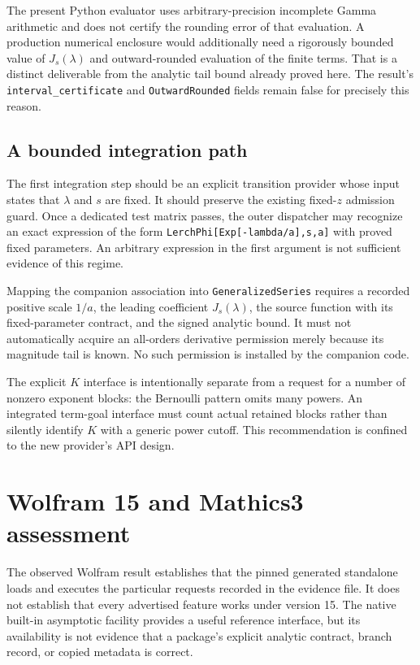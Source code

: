 \documentclass[11pt,a4paper]{article}
\newcommand{\code}[1]{\nolinkurl{#1}}
\begin{document}
The present Python evaluator uses arbitrary-precision incomplete Gamma
arithmetic and does not certify the rounding error of that evaluation.
A production numerical enclosure would additionally need a rigorously bounded
value of $J_s(\lambda)$ and outward-rounded evaluation of the finite terms.
That is a distinct deliverable from the analytic tail bound already proved
here. The result's \code{interval_certificate} and \code{OutwardRounded} fields
remain false for precisely this reason.

\subsection{A bounded integration path}

The first integration step should be an explicit transition provider whose
input states that $\lambda$ and $s$ are fixed. It should preserve the existing
fixed-$z$ admission guard. Once a dedicated test matrix passes, the outer
dispatcher may recognize an exact expression of the form
\code{LerchPhi[Exp[-lambda/a],s,a]} with proved fixed parameters.
An arbitrary expression in the first argument is not sufficient evidence of
this regime.

Mapping the companion association into \code{GeneralizedSeries} requires a
recorded positive scale $1/a$, the leading coefficient $J_s(\lambda)$, the
source function with its fixed-parameter contract, and the signed analytic
bound. It must not automatically acquire an all-orders derivative permission
merely because its magnitude tail is known. No such permission is installed
by the companion code.

The explicit $K$ interface is intentionally separate from a request for a
number of nonzero exponent blocks: the Bernoulli pattern omits many powers.
An integrated term-goal interface must count actual retained blocks rather
than silently identify $K$ with a generic power cutoff. This recommendation
is confined to the new provider's API design.

\section{Wolfram 15 and Mathics3 assessment}

The observed Wolfram result establishes that the pinned generated standalone
loads and executes the particular requests recorded in the evidence file.
It does not establish that every advertised feature works under version 15.
The native built-in asymptotic facility provides a useful reference interface,
but its availability is not evidence that a package's explicit analytic
contract, branch record, or copied metadata is correct.\cite{wolframasymptotic}
\end{document}
